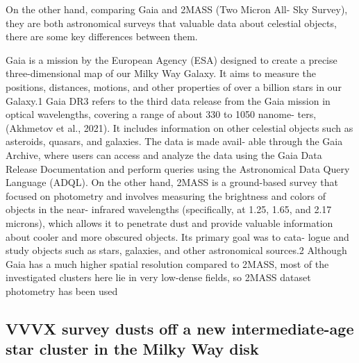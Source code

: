\documentclass[../Main.tex]{subfiles}
\begin{document}
{On the other hand, comparing Gaia and 2MASS (Two Micron All-
Sky Survey), they are both astronomical surveys that valuable data
about celestial objects, there are some key differences between them.

Gaia is a mission by the European Agency (ESA) designed to create
a precise three-dimensional map of our Milky Way Galaxy. It aims to
measure the positions, distances, motions, and other properties of over
a billion stars in our Galaxy.1
Gaia DR3 refers to the third data release from the Gaia mission in
optical wavelengths, covering a range of about 330 to 1050 nanome-
ters, (Akhmetov et al., 2021). It includes information on other celestial
objects such as asteroids, quasars, and galaxies. The data is made avail-
able through the Gaia Archive, where users can access and analyze the
data using the Gaia Data Release Documentation and perform queries
using the Astronomical Data Query Language (ADQL). On the other
hand, 2MASS is a ground-based survey that focused on photometry and
involves measuring the brightness and colors of objects in the near-
infrared wavelengths (specifically, at 1.25, 1.65, and 2.17 microns),
which allows it to penetrate dust and provide valuable information
about cooler and more obscured objects. Its primary goal was to cata-
logue and study objects such as stars, galaxies, and other astronomical
sources.2 Although Gaia has a much higher spatial resolution compared
to 2MASS, most of the investigated clusters here lie in very low-dense
fields, so 2MASS dataset photometry has been used

\subsection{VVVX survey dusts off a new intermediate-age star cluster in the
Milky Way disk}


}
\end{document}
